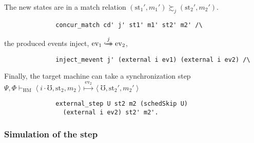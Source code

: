 \noindent The new states are in a match relation $(\text{st}_1', m_1') \succsim_{j} (\text{st}_2', m_2')$. 
\begin{lstlisting}
              concur_match cd' j' st1' m1' st2' m2' /\
\end{lstlisting}     
\noindent the produced events inject, $\text{ev}_1 \overset{j}{\hookrightarrow\mathrel{\mspace{-15mu}}\rightarrow} \text{ev}_2$,
\begin{lstlisting}
              inject_mevent j' (external i ev1) (external i ev2) /\
\end{lstlisting}     
\noindent Finally, the target machine can take a synchronization step 
$\Psi,\Phi \vdash_\mathrm{HM} 
\left<i\cdot\mho, \text{st}_2, m_2 \right>
\!\!\stackrel{\mathrm{ev}_2}\mapsto\!\!
\left<\mho, \text{st}_2', m_2' \right>$
\begin{lstlisting}
              external_step U st2 m2 (schedSkip U)
                (external i ev2) st2' m2'.
\end{lstlisting}	

\subsubsection{Simulation of the  step}

